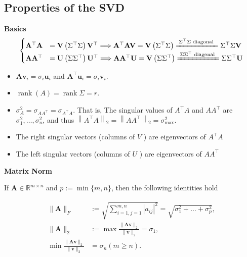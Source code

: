 \documentclass[14pt]{article}
\theoremstyle{definition}
\theoremstyle{remark}
\begin{document}
\subsection*{Properties of the SVD}
\begin{multicols*}{2}

\textbf{Basics}
$$
    \begin{cases}
        \mathbf{A}^\top\mathbf{A} &=\mathbf{V}\left(\Sigma^\top \Sigma\right) \mathbf{V}^\top \Longrightarrow \mathbf{A}^\top \mathbf{A}\mathbf{V} = \mathbf{V}\left(\Sigma^\top \Sigma\right) \xlongequal{\Sigma^\top \Sigma \text{ diagonal }}\Sigma^\top \Sigma \mathbf{V}\\
        \mathbf{A}\mathbf{A}^\top &=\mathbf{U}\left(\Sigma \Sigma^\top\right) \mathbf{U}^\top \Longrightarrow \mathbf{A} \mathbf{A}^\top\mathbf{U} = \mathbf{V}\left(\Sigma \Sigma^\top\right) \xlongequal{\Sigma \Sigma^\top \text{ diagonal }}\Sigma \Sigma^\top \mathbf{U}
    \end{cases}
$$
\begin{itemize}
    \item $\mathbf{A}\mathbf{v}_{i}=\sigma_{i} \mathbf{u}_{i}$ and $\mathbf{A}^{\top} \mathbf{u}_{i}=\sigma_{i} \mathbf{v}_{i}$.
    \item $\operatorname{rank}(A)=\operatorname{rank}\Sigma = r$.
    \item $\sigma_A^2 = \sigma_{A A^{\top}} = \sigma_{A^{\top} A}$. That is, The singular values of
          $A^\top A$ and $A A^\top$ are $\sigma_1^2, \ldots, \sigma_n^2$, and thus $\left\|A^\top A\right\|_2 = \left\|A A^\top\right\|_2=\sigma_{\max }^2$.
    \item The right singular vectors (columns of $V$ ) are eigenvectors of $A^{\top} A$
    \item The left singular vectors (columns of $U$ ) are eigenvectors of $A A^{\top}$
\end{itemize}

\textbf{Matrix Norm}

    If $\mathbf{A} \in \mathbb{R}^{m \times n}$ and $p:=\min \{m, n\}$, then the following identities hold

    $$
        \begin{aligned}
            \|\mathbf{A}\|_{F}                                            & :=\sqrt{\sum_{i=1, j=1}^{m, n}\left|a_{i j}\right|^{2}}=\sqrt{\sigma_{1}^{2}+\ldots+\sigma_{p}^{2}}, \\
            \|\mathbf{A}\|_{2}                                            & :=\max \frac{\|\mathbf{A} \mathbf{v}\|_{2}}{\|\mathbf{v}\|_{2}}=\sigma_{1},                          \\
            \min \frac{\|\mathbf{A} \mathbf{v}\|_{2}}{\|\mathbf{v}\|_{2}} & =\sigma_{n}(m \geq n) .
        \end{aligned}
    $$


\end{multicols*}
\end{document}

